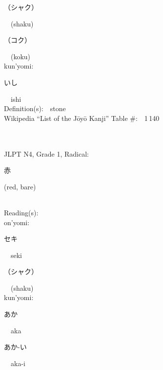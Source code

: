 \begin{multicols}{2}
{\hspace*{2em}}{\begin{CJK}{UTF8}{min} （シャク） \end{CJK}}\ \ (shaku)\ \ \\
{\hspace*{2em}}{\begin{CJK}{UTF8}{min} （コク） \end{CJK}}\ \ (koku)\ \ \\
{\hspace*{1em}}kun'yomi:\ \ \\
{\hspace*{2em}}{\begin{CJK}{UTF8}{min} いし \end{CJK}}\ \ ishi\ \ \\
Definition(s):\ \ stone \\
Wikipedia ``List of the J\=oy\=o Kanji'' Table \#:\ \ 1\,140 \\
\ \ \\
{\fontsize{34pt}{40pt}  }\ \ \\  %
{JLPT N4, Grade 1, Radical:\ \ {\begin{CJK}{UTF8}{min} 赤 \end{CJK}} (red, bare) } \\
Reading(s):\ \ \\
{\hspace*{1em}}on'yomi:\ \ \\
{\hspace*{2em}}{\begin{CJK}{UTF8}{min} セキ \end{CJK}}\ \ seki\ \ \\
{\hspace*{2em}}{\begin{CJK}{UTF8}{min} （シャク） \end{CJK}}\ \ (shaku)\ \ \\
{\hspace*{1em}}kun'yomi:\ \ \\
{\hspace*{2em}}{\begin{CJK}{UTF8}{min} あか \end{CJK}}\ \ aka\ \ \\
{\hspace*{2em}}{\begin{CJK}{UTF8}{min} あか-い \end{CJK}}\ \ aka-i\ \ \\

\end{multicols}
